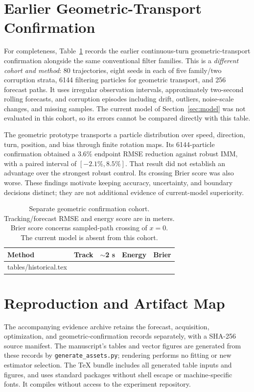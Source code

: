 \documentclass[journal]{IEEEtran}
\makeatletter
\newcommand{\inputrows}[1]{\@@input #1 }
\makeatother
\begin{document}
\section{Earlier Geometric-Transport Confirmation}
\label{app:historical}

For completeness, Table~\ref{tab:historical} records the earlier
continuous-turn geometric-transport confirmation alongside the same
conventional filter families. This is a \emph{different cohort and
method}: 80 trajectories, eight seeds in each of five family/two
corruption strata, 6144 filtering particles for geometric transport,
and 256 forecast paths. It uses irregular observation intervals,
approximately two-second rolling forecasts, and corruption episodes
including drift, outliers, noise-scale changes, and missing samples.
The current model of Section~\ref{sec:model} was not evaluated in this
cohort, so its errors cannot be compared directly with this table.

The geometric prototype transports a particle distribution over speed,
direction, turn, position, and bias through finite rotation maps. Its
6144-particle confirmation obtained a 3.6\% endpoint RMSE reduction
against robust IMM, with a paired interval of $[-2.1\%,8.5\%]$.
That result did not establish an advantage over the strongest robust
control. Its crossing Brier score was also worse. These findings
motivate keeping accuracy, uncertainty, and boundary decisions distinct;
they are not additional evidence of current-model superiority.

\begin{table}[h]
\centering
\caption{Separate geometric confirmation cohort. Tracking/forecast
RMSE and energy score are in meters. Brier score concerns sampled-path
crossing of $x=0$. The current model is absent from this cohort.}
\label{tab:historical}
\small\setlength{\tabcolsep}{3pt}
\begin{tabular}{lrrrr}
\toprule Method & Track & $\sim$2 s & Energy & Brier\\\midrule
\inputrows{tables/historical.tex}
\bottomrule
\end{tabular}
\end{table}

\section{Reproduction and Artifact Map}
\label{app:artifact}
\begingroup\raggedright

The accompanying evidence archive retains the forecast, acquisition,
optimization, and geometric-confirmation records separately, with a
SHA-256 source manifest. The manuscript's tables and vector figures are
generated from these records by \texttt{generate\_assets.py}; rendering
performs no fitting or new estimator selection. The TeX bundle includes
all generated table inputs and figures, and uses standard packages
without shell escape or machine-specific fonts. It compiles without
access to the experiment repository.
\end{document}
